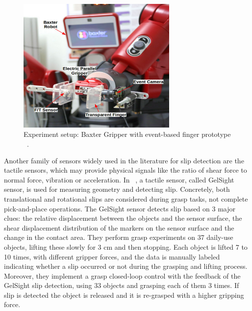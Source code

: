 \begin{figure}[h]
    \centering
    \includegraphics[width=0.7\textwidth]{resources/images/muthusamy2020slip}
    \caption{Experiment setup: Baxter Gripper with event-based finger prototype ~\cite{muthusamy2020slip}.}\label{fig:muthusamy2020slip}
\end{figure}

Another family of sensors widely used in the literature for slip detection are the tactile sensors, which may provide physical signals like the ratio of shear force to normal force, vibration or acceleration. In ~\cite{gelsight2017}, a tactile sensor, called GelSight sensor, is used for measuring geometry and detecting slip. Concretely, both translational and rotational slips are considered during grasp tasks, not complete pick-and-place operations. The GelSight sensor detects slip based on 3 major clues: the relative displacement between the objects and the sensor surface, the shear displacement distribution of the markers on the sensor surface and the change in the contact
area. They perform grasp experiments on 37 daily-use objects, lifting these slowly for 3 cm and then stopping. Each object is lifted 7 to 10 times, with different gripper forces, and the data is manually labeled indicating whether a slip occurred or not during the grasping and lifting process. Moreover, they implement a grasp closed-loop control with the feedback of the GelSight slip detection, using 33 objects and grasping each of them 3 times. If slip is detected the object is released and it is re-grasped with a higher gripping force.\\

